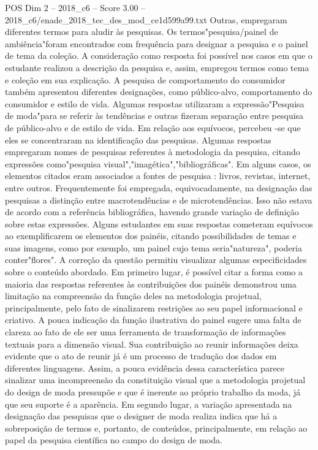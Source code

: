 \begin{textsample}{POS Dim 2 – 2018\_c6 – Score 3.00 – 2018\_c6/enade\_2018\_tec\_des\_mod\_ce1d599a99.txt}
Outras, empregaram diferentes termos para aludir às pesquisas.
Os termos"pesquisa/painel de ambiência"foram encontrados com frequência para designar a pesquisa e o painel de tema da coleção.
A consideração como resposta foi possível nos casos em que o estudante realizou a descrição da pesquisa e, assim, empregou termos como tema e coleção em sua explicação.
A pesquisa de comportamento do consumidor também apresentou diferentes designações, como público-alvo, comportamento do consumidor e estilo de vida.
Algumas respostas utilizaram a expressão"Pesquisa de moda"para se referir às tendências e outras fizeram separação entre pesquisa de público-alvo e de estilo de vida.
Em relação aos equívocos, percebeu -se que eles se concentraram na identificação das pesquisas.
Algumas respostas empregaram nomes de pesquisas referentes à metodologia da pesquisa, citando expressões como"pesquisa visual","imagética","bibliográficas".
Em alguns casos, os elementos citados eram associados a fontes de pesquisa : livros, revistas, internet, entre outros.
Frequentemente foi empregada, equivocadamente, na designação das pesquisas a distinção entre macrotendências e de microtendências.
Isso não estava de acordo com a referência bibliográfica, havendo grande variação de definição sobre estas expressões.
Alguns estudantes em suas respostas cometeram equívocos ao exemplificarem os elementos dos painéis, citando possibilidades de temas e suas imagens, como por exemplo, um painel cujo tema seria"natureza", poderia conter"flores".
A correção da questão permitiu visualizar algumas especificidades sobre o conteúdo abordado.
Em primeiro lugar, é possível citar a forma como a maioria das respostas referentes às contribuições dos painéis demonstrou uma limitação na compreensão da função deles na metodologia projetual, principalmente, pelo fato de sinalizarem restrições ao seu papel informacional e criativo.
A pouca indicação da função ilustrativa do painel sugere uma falta de clareza ao fato de ele ser uma ferramenta de transformação de informações textuais para a dimensão visual.
Sua contribuição ao reunir informações deixa evidente que o ato de reunir já é um processo de tradução dos dados em diferentes linguagens.
Assim, a pouca evidência dessa característica parece sinalizar uma incompreensão da constituição visual que a metodologia projetual do design de moda pressupõe e que é inerente ao próprio trabalho da moda, já que seu suporte é a aparência.
Em segundo lugar, a variação apresentada na designação das pesquisas que o designer de moda realiza indica que há a sobreposição de termos e, portanto, de conteúdos, principalmente, em relação ao papel da pesquisa científica no campo do design de moda.

\end{textsample}
